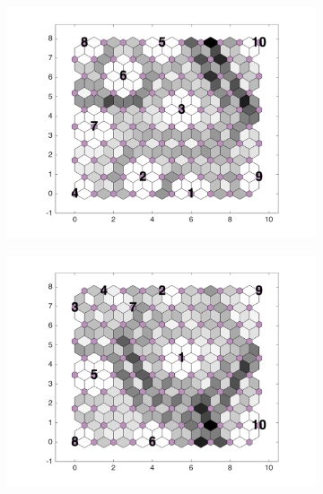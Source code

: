 \begin{figure}
\begin{subfigure}[b]{0.3\textwidth}
        \includegraphics[width=\textwidth]{../../images0.01/M31/2D/diff_dimension/combine_2D_data_between_cols3and19.png}
        \label{fig: col3and19_dist}
    \end{subfigure}
        \hfill
    \begin{subfigure}[b]{0.3\textwidth}
        \centering
        \includegraphics[width=\textwidth]{../../images0.01/M31/2D/diff_dimension/combine_2D_data_between_cols3and20.png}
        \label{fig: col3and20_dist}
    \end{subfigure}        \hfill
    \begin{subfigure}[b]{0.3\textwidth}
        \centering

\end{subfigure}
\end{figure}

